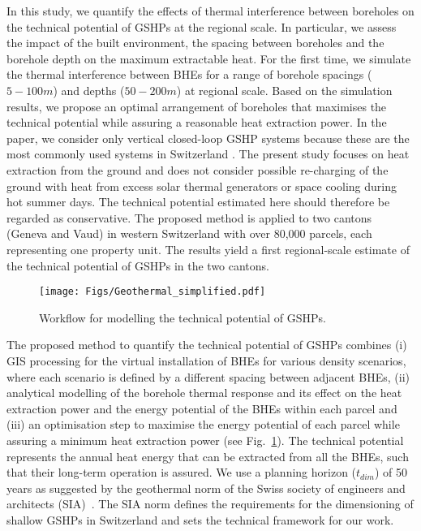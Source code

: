 In this study, we quantify the effects of thermal interference between boreholes on the technical potential of GSHPs at the regional scale. 
In particular, we assess the impact of the built environment, the spacing between boreholes and the borehole depth on the maximum extractable heat.
For the first time, we simulate the thermal interference between BHEs for a range of borehole spacings ($5-100m$) and depths ($50-200m$) at regional scale. 
Based on the simulation results, we propose an optimal arrangement of boreholes that maximises the technical potential while assuring a reasonable heat extraction power.
In the paper, we consider only vertical closed-loop GSHP systems because these are the most commonly used systems in Switzerland \cite{link_statistik_2019}.
The present study focuses on heat extraction from the ground and does not consider possible re-charging of the ground with heat from excess solar thermal generators or space cooling during hot summer days.
The technical potential estimated here should therefore be regarded as conservative.
The proposed method is applied to two cantons (Geneva and Vaud) in western Switzerland with over 80,000 parcels, each representing one property unit.
The results yield a first regional-scale estimate of the technical potential of GSHPs in the two cantons.

\begin{figure}[tb]
\centering\texttt{[image: Figs/Geothermal\_simplified.pdf]}
\caption{Workflow for modelling the technical potential of GSHPs.}
\label{fig:workflow_BHE}
\end{figure}

The proposed method to quantify the technical potential of GSHPs combines 
(i) GIS processing for the virtual installation of BHEs for various density scenarios, where each scenario is defined by a different spacing between adjacent BHEs,
(ii) analytical modelling of the borehole thermal response and its effect on the heat extraction power and the energy potential of the BHEs within each parcel  %
and (iii) an optimisation step to maximise the energy potential of each parcel while assuring a minimum heat extraction power (see Fig.~\ref{fig:workflow_BHE}). %
The technical potential represents the annual heat energy that can be extracted from all the BHEs, such that their long-term operation is assured. 
We use a planning horizon ($t_{dim}$) of 50 years as suggested by the geothermal norm of the Swiss society of engineers and architects (SIA)~\cite{sia_sondes_2010}. 
The SIA norm defines the requirements for the dimensioning of shallow GSHPs in Switzerland and sets the technical framework for our work.


